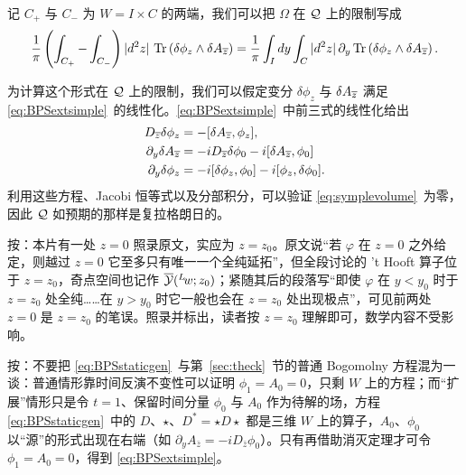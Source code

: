 记 $C_+$ 与 $C_-$ 为 $W=I\times C$ 的两端，我们可以把 $\Omega$ 在 ${{\mathcal{Q}}}$ 上的限制写成
\setcounter{equation}{40}
\begin{equation}\label{eq:symplevolume}
{1\over\pi}\left(\int_{C_+}
-\int_{C_-}\right)|d^2 z|\,\operatorname{Tr}\left(\delta\phi_z\wedge \delta
A_{\overline z}\right)={1\over \pi}\int_Idy\int_C|d^2z|\,
\partial_y \operatorname{Tr}\left(\delta\phi_z\wedge\delta A_{\overline z}\right).
\end{equation}

为计算这个形式在 ${\mathcal{Q}}$ 上的限制，我们可以假定变分 $\delta\phi_z$ 与 $\delta A_{\overline z}$ 满足 \eqref{eq:BPSextsimple}\ 的线性化。\eqref{eq:BPSextsimple}\ 中前三式的线性化给出
\setcounter{equation}{41}
\begin{equation}\label{eq:BPSlin}
\begin{aligned}D_{\overline z}\delta\phi_z&=-[\delta
A_{\overline z},\phi_z],\\
\partial_y\delta A_{\overline z}&=-iD_{\overline z}\delta\phi_0 - i [\delta
A_{\overline z},\phi_0]\\
\partial_y\delta\phi_z&=-i[\delta\phi_z,\phi_0]-i[\phi_z,\delta\phi_0]
.\\\end{aligned}
\end{equation}
 利用这些方程、Jacobi 恒等式以及分部积分，可以验证 \eqref{eq:symplevolume}\ 为零，因此 ${{\mathcal{Q}}}$ 如预期的那样是复拉格朗日的。

\begin{yizhu}[原文疑误]
按：本片有一处 $z=0$ 照录原文，实应为 $z=z_0$。原文说“若 $\varphi$ 在 $z=0$ 之外给定，则越过 $z=0$ 它至多只有唯一一个全纯延拓”，但全段讨论的 't Hooft 算子位于 $z=z_0$，奇点空间也记作 $\overline {{\mathcal{Y}}}({}^L\negthinspace w;z_0)$；紧随其后的段落写“即使 $\varphi$ 在 $y<y_0$ 时于 $z=z_0$ 处全纯……在 $y>y_0$ 时它一般也会在 $z=z_0$ 处出现极点”，可见前两处 $z=0$ 是 $z=z_0$ 的笔误。照录并标出，读者按 $z=z_0$ 理解即可，数学内容不受影响。
\end{yizhu}

\begin{yizhu}[易错点]
按：不要把 \eqref{eq:BPSstaticgen}\ 与第~\ref{sec:theck}~节的普通 Bogomolny 方程混为一谈：普通情形靠时间反演不变性可以证明 $\phi_1=A_0=0$，只剩 $W$ 上的方程；而“扩展”情形只是令 $t=1$、保留时间分量 $\phi_0$ 与 $A_0$ 作为待解的场，方程 \eqref{eq:BPSstaticgen}\ 中的 $D$、$\star$、$D^*=\star D\star$ 都是三维 $W$ 上的算子，$A_0$、$\phi_0$ 以“源”的形式出现在右端（如 $\partial_yA_{\bar z}=-iD_{\bar z}\phi_0$）。只有再借助消灭定理才可令 $\phi_1=A_0=0$，得到 \eqref{eq:BPSextsimple}。
\end{yizhu}

